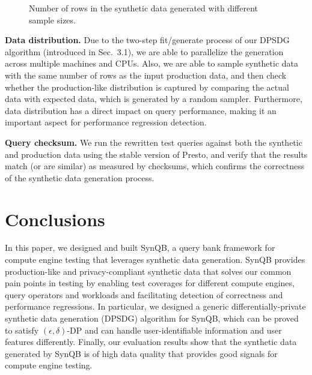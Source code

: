 \documentclass[11pt]{article}
\begin{document}
\begin{figure}[h]
\centering
{}
\caption{Number of rows in the synthetic data generated with different sample sizes.}
\label{fig:eval}
\end{figure}

\textbf{Data distribution.} Due to the two-step fit/generate process
of our DPSDG algorithm (introduced in Sec.~3.1), we are able to
parallelize the generation across multiple machines and CPUs. Also,
we are able to sample synthetic data with the same number of rows
as the input production data, and then check whether the production-like
distribution is captured by comparing the actual data with
expected data, which is generated by a random sampler. Furthermore,
data distribution has a direct impact on query performance, making
it an important aspect for performance regression detection.

\textbf{Query checksum.} We run the rewritten test queries against both
the synthetic and production data using the stable version of Presto,
and verify that the results match (or are similar) as measured by
checksums, which confirms the correctness of the synthetic data
generation process.

\section{Conclusions}
In this paper, we designed and built SynQB, a query bank framework
for compute engine testing that leverages synthetic data generation.
SynQB provides production-like and privacy-compliant synthetic
data that solves our common pain points in testing by enabling
test coverages for different compute engines, query operators and
workloads and facilitating detection of correctness and performance
regressions. In particular, we designed a generic differentially-private
synthetic data generation (DPSDG) algorithm for SynQB,
which can be proved to satisfy $(\epsilon,\delta)$-DP and can handle
user-identifiable information and user features differently. Finally,
our evaluation results show that the synthetic data generated by
SynQB is of high data quality that provides good signals for
compute engine testing.
\end{document}
